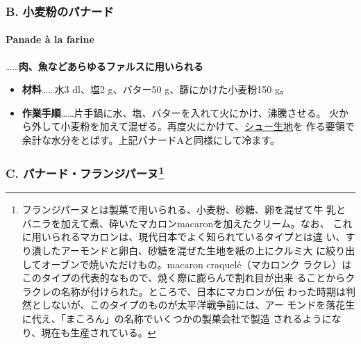 \begin{recette}
{\subsubsection{B.
小麦粉のパナード}\label{b.-ux5c0fux9ea6ux7c89ux306eux30d1ux30caux30fcux30c9}}

\hypertarget{panade-b}{%
\paragraph{Panade à la farine}\label{panade-b}}


\ldots{}\ldots{}\textbf{肉、魚などあらゆるファルスに用いられる}

\begin{itemize}
\item
  \textbf{材料}\ldots{}\ldots{}水3 dl、塩2 g、バター50
  g、篩にかけた小麦粉150 g。
\item
  \textbf{作業手順}\ldots{}\ldots{}片手鍋に水、塩、バターを入れて火にかけ、沸騰させる。
  火から外して小麦粉を加えて混ぜる。再度火にかけて、\protect\hyperlink{}{シュー生地}を
  作る要領で余計な水分をとばす。上記パナードAと同様にして冷ます。
\end{itemize}

\maeaki

\hypertarget{c.-ux30d1ux30caux30fcux30c9ux30d5ux30e9ux30f3ux30b8ux30d1ux30fcux30cc12}{%
\subsubsection[C. パナード・フランジパーヌ]{\texorpdfstring{C.
パナード・フランジパーヌ\footnote{フランジパーヌとは製菓で用いられる、小麦粉、砂糖、卵を混ぜて牛
  乳とバニラを加えて煮、砕いたマカロンmacaronを加えたクリーム。なお、
  これに用いられるマカロンは、現代日本でよく知られているタイプとは違
  い、すり潰したアーモンドと卵白、砂糖を混ぜた生地を紙の上にクルミ大
  に絞り出してオーブンで焼いただけもの。macaron craquelé（マカロンク
  ラクレ）はこのタイプの代表的なもので、焼く際に膨らんで割れ目が出来
  ることからクラクレの名称が付けられた。ところで、日本にマカロンが伝
  わった時期は判然としないが、このタイプのものが太平洋戦争前には、アー
  モンドを落花生に代え、「まころん」の名称でいくつかの製菓会社で製造
  されるようになり、現在も生産されている。}}{C. パナード・フランジパーヌ}}\label{c.-ux30d1ux30caux30fcux30c9ux30d5ux30e9ux30f3ux30b8ux30d1ux30fcux30cc12}}


\end{recette}

